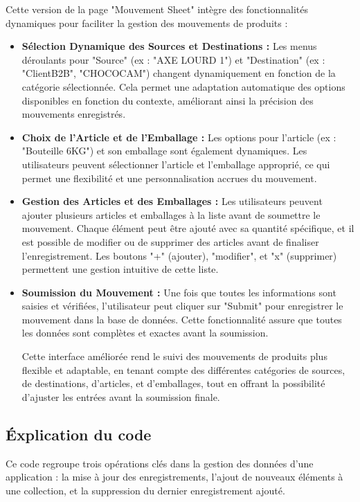 \documentclass[a4paper, oneside, 12pt, final]{extreport}
\begin{document}
Cette version de la page "Mouvement Sheet" intègre des fonctionnalités dynamiques pour faciliter la gestion des mouvements de produits :
\begin{itemize}


\item \textbf{Sélection Dynamique des Sources et Destinations :} Les menus déroulants pour "Source" (ex : "AXE LOURD 1") et "Destination" (ex : "ClientB2B", "CHOCOCAM") changent dynamiquement en fonction de la catégorie sélectionnée. Cela permet une adaptation automatique des options disponibles en fonction du contexte, améliorant ainsi la précision des mouvements enregistrés.

\item \textbf{Choix de l'Article et de l'Emballage :} Les options pour l'article (ex : "Bouteille 6KG") et son emballage sont également dynamiques. Les utilisateurs peuvent sélectionner l'article et l'emballage approprié, ce qui permet une flexibilité et une personnalisation accrues du mouvement.

\item \textbf{Gestion des Articles et des Emballages :} Les utilisateurs peuvent ajouter plusieurs articles et emballages à la liste avant de soumettre le mouvement. Chaque élément peut être ajouté avec sa quantité spécifique, et il est possible de modifier ou de supprimer des articles avant de finaliser l'enregistrement. Les boutons "+" (ajouter), "modifier", et "x" (supprimer) permettent une gestion intuitive de cette liste.

\item \textbf{Soumission du Mouvement :} Une fois que toutes les informations sont saisies et vérifiées, l'utilisateur peut cliquer sur "Submit" pour enregistrer le mouvement dans la base de données. Cette fonctionnalité assure que toutes les données sont complètes et exactes avant la soumission.

Cette interface améliorée rend le suivi des mouvements de produits plus flexible et adaptable, en tenant compte des différentes catégories de sources, de destinations, d'articles, et d'emballages, tout en offrant la possibilité d'ajuster les entrées avant la soumission finale.
\end{itemize}
\subsection{Éxplication du code}
Ce code regroupe trois opérations clés dans la gestion des données d'une application : la mise à jour des enregistrements, l'ajout de nouveaux éléments à une collection, et la suppression du dernier enregistrement ajouté.
\end{document}
